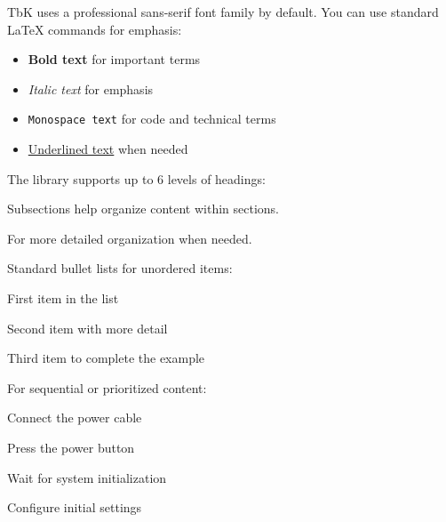 \documentclass[11pt,a4paper]{article}
\begin{document}

\clearpage
{}


TbK uses a professional sans-serif font family by default. You can use standard LaTeX commands for emphasis:

\begin{itemize}
  \item \textbf{Bold text} for important terms
  \item \textit{Italic text} for emphasis
  \item \texttt{Monospace text} for code and technical terms
  \item \underline{Underlined text} when needed
\end{itemize}


The library supports up to 6 levels of headings:


Subsections help organize content within sections.


For more detailed organization when needed.


\clearpage
{}


Standard bullet lists for unordered items:

\begin{tbkList}
  \item First item in the list
  \item Second item with more detail
  \item Third item to complete the example
\end{tbkList}


For sequential or prioritized content:

\begin{tbkNumberedList}
  \item Connect the power cable
  \item Press the power button
  \item Wait for system initialization
  \item Configure initial settings
\end{tbkNumberedList}
\end{document}
